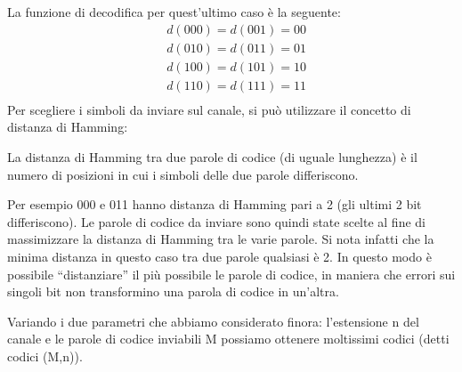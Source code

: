 \newpage
\noindent
La funzione di decodifica per quest'ultimo caso è la seguente:
\[\begin{split}
 &d(000)=d(001)=00  \\
 &d(010)=d(011)=01  \\
 &d(100)=d(101)=10  \\
 &d(110)=d(111)=11  \\
 \end{split}
\]
Per scegliere i simboli da inviare sul canale, si può utilizzare il concetto di distanza di Hamming:
\begin{definizione}
La distanza di Hamming tra due parole di codice (di uguale lunghezza) è il numero di posizioni in cui i 
simboli delle due parole differiscono.
\end{definizione}

Per esempio 000 e 011 hanno distanza di Hamming pari a 2 (gli ultimi 2 bit differiscono). Le parole di codice da inviare sono 
quindi state scelte al fine di massimizzare la distanza di Hamming tra le varie parole. Si nota infatti che la minima distanza in 
questo caso tra due parole qualsiasi è 2. In questo modo è possibile ``distanziare'' il più possibile le parole di codice, in maniera che errori sui singoli bit non transformino una parola di codice in un'altra.

%
%

Variando i due parametri che abbiamo considerato finora: l'estensione n del canale e le parole di codice inviabili M possiamo ottenere moltissimi codici (detti codici (M,n)).

